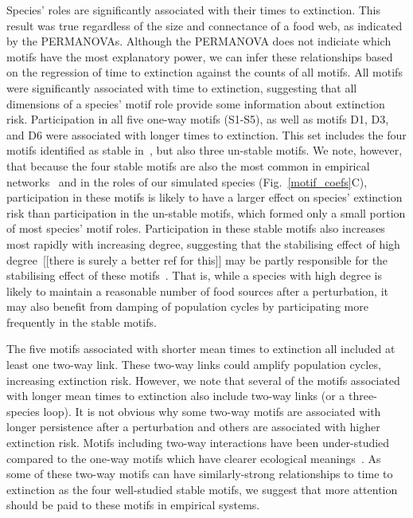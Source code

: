 \documentclass[12pt]{article}
\begin{document}
	    Species' roles are significantly associated with their times to extinction. This result was true regardless of the size and connectance of a food web, as indicated by the PERMANOVAs.
		Although the PERMANOVA does not indiciate which motifs have the most explanatory power, we can infer these relationships based on the regression of time to extinction against the counts of all motifs.
		All motifs were significantly associated with time to extinction, suggesting that all dimensions of a species' motif role provide some information about extinction risk.
		Participation in all five one-way motifs (S1-S5), as well as motifs D1, D3, and D6 were associated with longer times to extinction. 
		This set includes the four motifs identified as stable in~\citet{Stouffer2007,Borrelli2015a}, but also three un-stable motifs. 
		We note, however, that because the four stable motifs are also the most common in empirical networks~\citep{Stouffer2007} and in the roles of our simulated species (Fig.~\ref{motif_coefs}C), participation in these motifs is likely to have a larger effect on species' extinction risk than participation in the un-stable motifs, which formed only a small portion of most species' motif roles.
		Participation in these stable motifs also increases most rapidly with increasing degree, suggesting that the stabilising effect of high degree~\citep{Cirtwill2016a}[[there is surely a better ref for this]] may be partly responsible for the stabilising effect of these motifs~\citep{Stouffer2007,Borrelli2015a}.
		That is, while a species with high degree is likely to maintain a reasonable number of food sources after a perturbation, it may also benefit from damping of population cycles by participating more frequently in the stable motifs.


        The five motifs associated with shorter mean times to extinction all included at least one two-way link. 
        These two-way links could amplify population cycles, increasing extinction risk.
        However, we note that several of the motifs associated with longer mean times to extinction also include two-way links (or a three-species loop).
		It is not obvious why some two-way motifs are associated with longer persistence after a perturbation and others are associated with higher extinction risk.
		Motifs including two-way interactions have been under-studied compared to the one-way motifs which have clearer ecological meanings~\citep{Bascompte2005,Cirtwill2015}.
		As some of these two-way motifs can have similarly-strong relationships to time to extinction as the four well-studied stable motifs, we suggest that more attention should be paid to these motifs in empirical systems.
\end{document}
